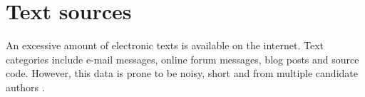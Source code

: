 \section{Text sources}
\label{sec:text_sources}

An excessive amount of electronic texts is available on the internet.
Text categories include e-mail messages, online forum messages, blog posts and source code.
However, this data is prone to be noisy, short and from multiple candidate authors \citep{stamatatos_survey_2009}.